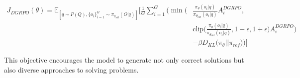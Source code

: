 \documentclass[10pt,twocolumn,letterpaper]{article}
\begin{document}
\begin{figure*}[t]
\begin{equation*}
\begin{split}
J_{DGRPO}(\theta) = \mathbb{E}_{[q \sim P(Q), \{o_i\}_{i=1}^G \sim \pi_{\theta_{old}}(O|q)]} \Bigg[ \frac{1}{G} \sum_{i=1}^G \Bigg( 
\min \Bigg( & \frac{\pi_\theta(o_i|q)}{\pi_{\theta_{old}}(o_i|q)} A_i^{DGRPO}, \\
& \text{clip} \Bigg( \frac{\pi_\theta(o_i|q)}{\pi_{\theta_{old}}(o_i|q)}, 1-\epsilon, 1+\epsilon \Bigg) A_i^{DGRPO} \Bigg) \\
& - \beta D_{KL} \big( \pi_\theta || \pi_{ref} \big) \Bigg) \Bigg]
\end{split}
\end{equation*}
\label{eq:dgrpo}
\end{figure*}

This objective encourages the model to generate not only correct solutions but also diverse approaches to solving problems.



\end{document}
